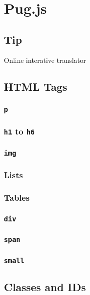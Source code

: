 \chapter{Pug.js}

\section{Tip}

Online interative translator

\section{HTML Tags}

\subsection{\texttt{p}}

\subsection{\texttt{h1} to \texttt{h6}}

\subsection{\texttt{img}}

\subsection{Lists}

\subsection{Tables}

\subsection{\texttt{div}}

\subsection{\texttt{span}}

\subsection{\texttt{small}}

\section{Classes and IDs}

